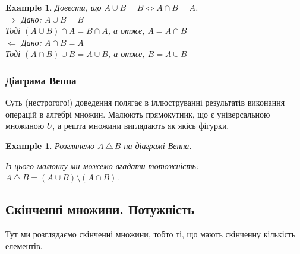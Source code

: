 \documentclass[a4paper, 14pt]{extarticle}
\def\rightproof{$\boxed{\Rightarrow}$ }
\def\leftproof{$\boxed{\Leftarrow}$ }
\theoremstyle{theoremdd}
\theoremstyle{theoremdd}
\theoremstyle{theoremdd}
\theoremstyle{theoremdd}
\theoremstyle{theoremdd}
\newtheorem{example}[theorem]{Example}
\theoremstyle{theoremdd}
\theoremstyle{theoremdd}
\theoremstyle{theoremdd}
\theoremstyle{theoremdd}
\theoremstyle{theoremdd}
\theoremstyle{theoremdd}
\theoremstyle{theoremdd}
\theoremstyle{theoremdd}
\theoremstyle{theoremdd}
\theoremstyle{theoremdd}
\newcommand{\symdif}{\,\triangle\,} %
\begin{document}
\begin{example}
Довести, що $A \cup B = B \iff A \cap B = A$.\\
\rightproof Дано: $A \cup B = B$\\
Тоді $(A \cup B) \cap A = B \cap A$, а отже, $A = A \cap B$
\bigskip \\
\leftproof Дано: $A \cap B = A$\\
Тоді $(A \cap B) \cup B = A \cup B$, а отже, $B = A \cup B$
\end{example}

\subsubsection{Діаграма Венна}
Суть (нестрогого!) доведення полягає в іллюструванні результатів виконання операцій в алгебрі множин. Малюють прямокутник, що є універсальною множиною $U$, а решта множини виглядають як якісь фігурки.
\begin{example}
Розглянемо $A \symdif B$ на діаграмі Венна.

\begin{figure}[H]
\centering
{}
\qquad
{}
\end{figure}
Із цього малюнку ми можемо вгадати тотожність: \\ $A \symdif B = (A \cup B) \setminus (A \cap B)$.
\end{example}

\subsection{Скінченні множини. Потужність}
Тут ми розглядаємо скінченні множини, тобто ті, що мають скінченну кількість елементів.
\end{document}

